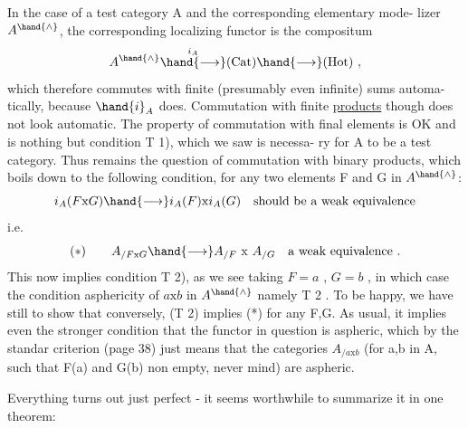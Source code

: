 In the case of a test category\xout{,} A and the corresponding elementary mode-%
lizer $A^{\hand{\wedge}}$,  the corresponding localizing functor is the compositum
\[ A^{\hand{\wedge}} \overset{i_A}{\hand{\longrightarrow}} (\mathrm{Cat}) \hand{\longrightarrow} (\mathrm{Hot}) \ , \]
which therefore commutes with finite (presumably even infinite) sums automa-%
tically,  because $\hand{i}_A$ does.  Commutation with finite \uline{products} though does
not look automatic.  The  property of commutation with final
elements is OK and is nothing but condition T 1),  which we saw is necessa-%
ry for A to be a test category.  Thus remains the question of commutation
with binary products,  which boils down to the following condition,  for
any two elements  F and G in $A^{\hand{\wedge}}$:
\[ i_A(F\mathrm{x}G) \hand{\longrightarrow} i_A(F)\mathrm{x}i_A(G) \quad \text{should be a weak equivalence} \]
i.e.
\[ (*) \qquad A_{/F\mathrm{x}G} \hand{\longrightarrow} A_{/F}\ \mathrm{x}\ A_{/G} \quad \text{a weak equivalence .} \]
 This now implies condition T 2),  as we see taking
$F = a$ , $G = b$ ,   in which case the condition   asphericity
of  $a\mathrm{x}b$ in $A^{\hand{\wedge}}$ namely  T 2 .  To be happy,  we have still to show that
conversely,  (T 2) implies (*)  for any F,G.  As usual,  it implies even the
stronger condition that the functor in question is aspheric,  which by the
standar criterion  (page 38)  just means that the categories $A_{/a\mathrm{x}b}$
(for a,b in A,  such  that F(a) and G(b) non empty,  never mind) are aspheric.

Everything turns out just perfect  -  it seems worthwhile to summarize
it in one theorem:
